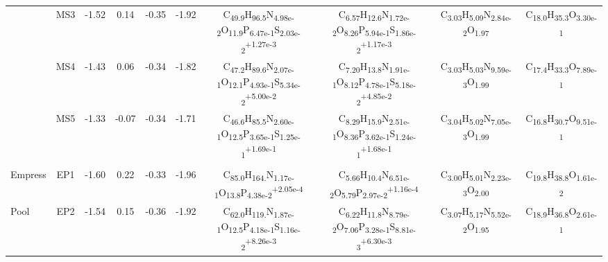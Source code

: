 {\begin{landscape}
\begin{table}
\begin{adjustbox}{width=600pt,keepaspectratio}
\begin{threeparttable}
\begin{tabular}{lccccccccc}
      & MS3   & -1.52 & 0.14  & -0.35 & -1.92 & C\textsubscript{49.9}H\textsubscript{96.5}N\textsubscript{4.98e-2}O\textsubscript{11.9}P\textsubscript{6.47e-1}S\textsubscript{2.03e-2}\textsuperscript{+1.27e-3} & C\textsubscript{6.57}H\textsubscript{12.6}N\textsubscript{1.72e-2}O\textsubscript{8.26}P\textsubscript{5.94e-1}S\textsubscript{1.86e-2}\textsuperscript{+1.17e-3} & C\textsubscript{3.03}H\textsubscript{5.09}N\textsubscript{2.84e-2}O\textsubscript{1.97} & C\textsubscript{18.0}H\textsubscript{35.3}O\textsubscript{3.30e-1} \\
      & MS4   & -1.43 & 0.06  & -0.34 & -1.82 & C\textsubscript{47.2}H\textsubscript{89.6}N\textsubscript{2.07e-1}O\textsubscript{12.1}P\textsubscript{4.93e-1}S\textsubscript{5.34e-2}\textsuperscript{+5.00e-2} & C\textsubscript{7.20}H\textsubscript{13.8}N\textsubscript{1.91e-1}O\textsubscript{8.12}P\textsubscript{4.78e-1}S\textsubscript{5.18e-2}\textsuperscript{+4.85e-2} & C\textsubscript{3.03}H\textsubscript{5.03}N\textsubscript{9.59e-3}O\textsubscript{1.99} & C\textsubscript{17.4}H\textsubscript{33.3}O\textsubscript{7.89e-1} \\
      & MS5   & -1.33 & -0.07 & -0.34 & -1.71 & C\textsubscript{46.6}H\textsubscript{85.5}N\textsubscript{2.60e-1}O\textsubscript{12.5}P\textsubscript{3.65e-1}S\textsubscript{1.25e-1}\textsuperscript{+1.69e-1} & C\textsubscript{8.29}H\textsubscript{15.9}N\textsubscript{2.51e-1}O\textsubscript{8.36}P\textsubscript{3.62e-1}S\textsubscript{1.24e-1}\textsuperscript{+1.68e-1} & C\textsubscript{3.04}H\textsubscript{5.02}N\textsubscript{7.05e-3}O\textsubscript{1.99} & C\textsubscript{16.8}H\textsubscript{30.7}O\textsubscript{9.51e-1} \\
      &       &       &       &       &       &       &       &       &  \\
Empress & EP1   & -1.60 & 0.22  & -0.33 & -1.96 & C\textsubscript{85.0}H\textsubscript{164.}N\textsubscript{1.17e-1}O\textsubscript{13.8}P\textsubscript{4.38e-2}\textsuperscript{+2.05e-4} & C\textsubscript{5.66}H\textsubscript{10.4}N\textsubscript{6.51e-2}O\textsubscript{5.79}P\textsubscript{2.97e-2}\textsuperscript{+1.16e-4} & C\textsubscript{3.00}H\textsubscript{5.01}N\textsubscript{2.23e-3}O\textsubscript{2.00} & C\textsubscript{19.8}H\textsubscript{38.8}O\textsubscript{1.61e-2} \\
Pool  & EP2   & -1.54 & 0.15  & -0.36 & -1.92 & C\textsubscript{62.0}H\textsubscript{119.}N\textsubscript{1.87e-1}O\textsubscript{12.5}P\textsubscript{4.18e-1}S\textsubscript{1.16e-2}\textsuperscript{+8.26e-3} & C\textsubscript{6.22}H\textsubscript{11.8}N\textsubscript{8.79e-2}O\textsubscript{7.06}P\textsubscript{3.28e-1}S\textsubscript{8.81e-3}\textsuperscript{+6.30e-3} & C\textsubscript{3.07}H\textsubscript{5.17}N\textsubscript{5.52e-2}O\textsubscript{1.95} & C\textsubscript{18.9}H\textsubscript{36.8}O\textsubscript{2.61e-1} \\

\end{tabular}
\end{threeparttable}
\end{adjustbox}
\end{table}
\end{landscape}}
